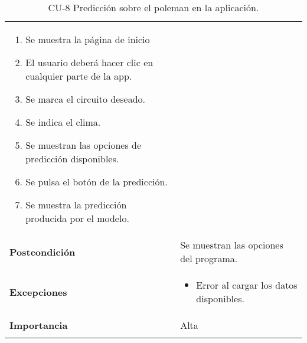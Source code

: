 \begin{longtable}[h!]{@{}ll@{}}
\begin{minipage}[t]{0.71\columnwidth}
\begin{enumerate}
\def\labelenumi{\arabic{enumi}.}
\tightlist
\item 
  Se muestra la página de inicio
\item
  El usuario deberá hacer clic en cualquier parte de la app.
\item
  Se marca el circuito deseado.
\item
  Se indica el clima.
\item
  Se muestran las opciones de predicción disponibles.
\item
  Se pulsa el botón de la predicción.
\item
  Se muestra la predicción producida por el modelo.
\end{enumerate}\strut
\end{minipage}\tabularnewline
\begin{minipage}[t]{0.23\columnwidth}\raggedright\strut
\textbf{Postcondición}\strut
\end{minipage} & \begin{minipage}[t]{0.71\columnwidth}\raggedright\strut
Se muestran las opciones del programa.\strut
\end{minipage}\tabularnewline
\begin{minipage}[t]{0.23\columnwidth}\raggedright\strut
\textbf{Excepciones}\strut
\end{minipage} & \begin{minipage}[t]{0.71\columnwidth}\raggedright\strut
\begin{itemize}
\tightlist
\item
  Error al cargar los datos disponibles.
\end{itemize}\strut
\end{minipage}\tabularnewline
\begin{minipage}[t]{0.23\columnwidth}\raggedright\strut
\textbf{Importancia}\strut
\end{minipage} & \begin{minipage}[t]{0.71\columnwidth}\raggedright\strut
Alta\strut
\end{minipage}\tabularnewline
\bottomrule
\caption{CU-8 Predicción sobre el poleman en la aplicación.}
\end{longtable}


